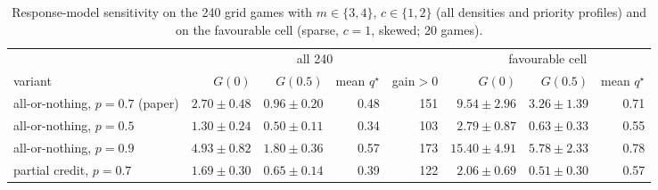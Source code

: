 \begin{table}[h]\centering\caption{Response-model sensitivity on the 240 grid games with $m\in\{3,4\}$, $c\in\{1,2\}$ (all densities and priority profiles) and on the favourable cell (sparse, $c=1$, skewed; 20 games).}\label{tab:s-term}\scriptsize
\begin{tabular}{@{}lrrrr|rrr@{}}\toprule & \multicolumn{4}{c|}{all 240} & \multicolumn{3}{c}{favourable cell}\\ variant & $G(0)$ & $G(0.5)$ & mean $q^\star$ & gain$>$0 & $G(0)$ & $G(0.5)$ & mean $q^\star$\\\midrule
all-or-nothing, $p=0.7$ (paper) & $2.70\pm0.48$ & $0.96\pm0.20$ & 0.48 & 151 & $9.54\pm2.96$ & $3.26\pm1.39$ & 0.71\\
all-or-nothing, $p=0.5$ & $1.30\pm0.24$ & $0.50\pm0.11$ & 0.34 & 103 & $2.79\pm0.87$ & $0.63\pm0.33$ & 0.55\\
all-or-nothing, $p=0.9$ & $4.93\pm0.82$ & $1.80\pm0.36$ & 0.57 & 173 & $15.40\pm4.91$ & $5.78\pm2.33$ & 0.78\\
partial credit, $p=0.7$ & $1.69\pm0.30$ & $0.65\pm0.14$ & 0.39 & 122 & $2.06\pm0.69$ & $0.51\pm0.30$ & 0.57\\
\bottomrule\end{tabular}\end{table}
